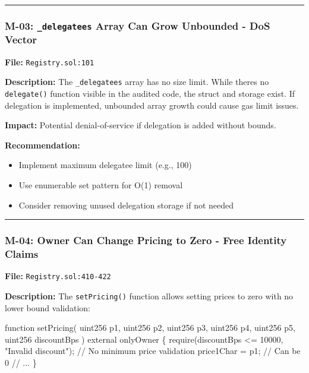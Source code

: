 \documentclass[
]{article}
\newenvironment{Shaded}{}{}
\newcommand{\NormalTok}[1]{#1}
\providecommand{\tightlist}{%
  \setlength{\itemsep}{0pt}\setlength{\parskip}{0pt}}
\begin{document}
\begin{center}\rule{0.5\linewidth}{0.5pt}\end{center}

\subsubsection{\texorpdfstring{M-03: \texttt{\_delegatees} Array Can
Grow Unbounded - DoS
Vector}{M-03: \_delegatees Array Can Grow Unbounded - DoS Vector}}\label{m-03-_delegatees-array-can-grow-unbounded---dos-vector}

\textbf{File:} \texttt{Registry.sol:101}

\textbf{Description:} The \texttt{\_delegatees} array has no size limit.
While there\textquotesingle s no \texttt{delegate()} function visible in
the audited code, the struct and storage exist. If delegation is
implemented, unbounded array growth could cause gas limit issues.

\textbf{Impact:} Potential denial-of-service if delegation is added
without bounds.

\textbf{Recommendation:}

\begin{itemize}
\tightlist
\item
  Implement maximum delegatee limit (e.g., 100)
\item
  Use enumerable set pattern for O(1) removal
\item
  Consider removing unused delegation storage if not needed
\end{itemize}

\begin{center}\rule{0.5\linewidth}{0.5pt}\end{center}

\subsubsection{M-04: Owner Can Change Pricing to Zero - Free Identity
Claims}\label{m-04-owner-can-change-pricing-to-zero---free-identity-claims}

\textbf{File:} \texttt{Registry.sol:410-422}

\textbf{Description:} The \texttt{setPricing()} function allows setting
prices to zero with no lower bound validation:

\begin{Shaded}
\begin{Highlighting}[]
\NormalTok{function setPricing(}
\NormalTok{    uint256 p1, uint256 p2, uint256 p3, uint256 p4, uint256 p5,}
\NormalTok{    uint256 discountBps}
\NormalTok{) external onlyOwner \{}
\NormalTok{    require(discountBps \textless{}= 10000, "Invalid discount");}
\NormalTok{    // No minimum price validation}
\NormalTok{    price1Char = p1;  // Can be 0}
\NormalTok{    // ...}
\NormalTok{\}}
\end{Highlighting}
\end{Shaded}
\end{document}
